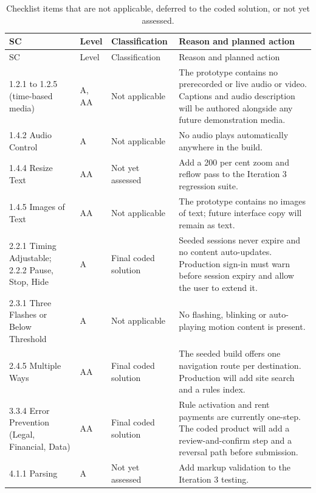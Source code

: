 \documentclass[11pt,a4paper]{article}
\begin{document}
{\footnotesize
\begin{longtable}{@{}L{3.2cm}L{0.9cm}L{2.7cm}L{6.0cm}@{}}
    \caption{Checklist items that are not applicable, deferred to the coded
    solution, or not yet assessed.}
    \label{taba11ydeferred}\\
    \toprule
    SC & Level & Classification & Reason and planned action\\
    \midrule
    \endfirsthead
    \toprule
    SC & Level & Classification & Reason and planned action\\
    \midrule
    \endhead
    \bottomrule
    \endlastfoot

    1.2.1 to 1.2.5 (time-based media) &
    A, AA &
    Not applicable &
    The prototype contains no prerecorded or live audio or video. Captions and
    audio description will be authored alongside any future demonstration
    media.\\

    1.4.2 Audio Control &
    A &
    Not applicable &
    No audio plays automatically anywhere in the build.\\

    1.4.4 Resize Text &
    AA &
    Not yet assessed &
    Add a 200 per cent zoom and reflow pass to the Iteration 3 regression
    suite.\\

    1.4.5 Images of Text &
    AA &
    Not applicable &
    The prototype contains no images of text; future interface copy will
    remain as text.\\

    2.2.1 Timing Adjustable; 2.2.2 Pause, Stop, Hide &
    A &
    Final coded solution &
    Seeded sessions never expire and no content auto-updates. Production
    sign-in must warn before session expiry and allow the user to extend it.\\

    2.3.1 Three Flashes or Below Threshold &
    A &
    Not applicable &
    No flashing, blinking or auto-playing motion content is present.\\

    2.4.5 Multiple Ways &
    AA &
    Final coded solution &
    The seeded build offers one navigation route per destination. Production
    will add site search and a rules index.\\

    3.3.4 Error Prevention (Legal, Financial, Data) &
    AA &
    Final coded solution &
    Rule activation and rent payments are currently one-step. The coded product
    will add a review-and-confirm step and a reversal path before submission.\\

    4.1.1 Parsing &
    A &
    Not yet assessed &
    Add markup validation to the Iteration 3 testing.\\
\end{longtable}
}
\end{document}
